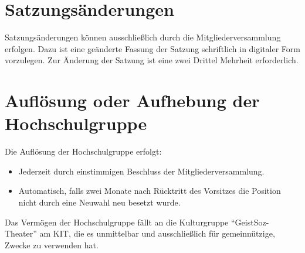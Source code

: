 \documentclass[11pt]{article}
\begin{document}
\section{Satzungsänderungen}
Satzungsänderungen können ausschließlich durch die Mitgliederversammlung erfolgen. Dazu ist eine geänderte Fassung der Satzung schriftlich in digitaler Form vorzulegen. Zur Änderung der Satzung ist eine zwei Drittel Mehrheit erforderlich.
\section{Auflösung oder Aufhebung der Hochschulgruppe}
Die Auflösung der Hochschulgruppe erfolgt:
\begin{itemize}
	\item Jederzeit durch einstimmigen Beschluss der Mitgliederversammlung.
	\item Automatisch, falls zwei Monate nach Rücktritt des Vorsitzes die Position nicht durch eine Neuwahl neu besetzt wurde.
\end{itemize}
Das Vermögen der Hochschulgruppe fällt an die Kulturgruppe ``GeistSoz-Theater'' am KIT, die es unmittelbar und ausschließlich für gemeinnützige,
Zwecke zu verwenden hat.
\end{document}
